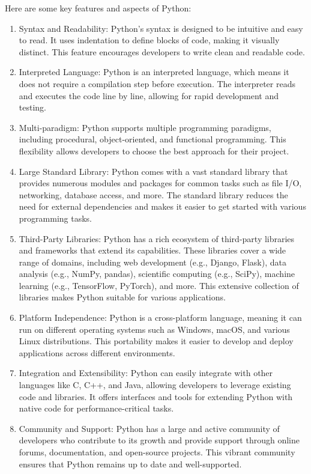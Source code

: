 \documentclass[12 pt, oneside]{book}
\begin{document}
Here are some key features and aspects of Python:
\begin{enumerate}
\item  Syntax and Readability: Python's syntax is designed to be intuitive and easy to read. It uses indentation to define blocks of code, making it visually distinct. This feature encourages developers to write clean and readable code.

\item  Interpreted Language: Python is an interpreted language, which means it does not require a compilation step before execution. The interpreter reads and executes the code line by line, allowing for rapid development and testing.

\item  Multi-paradigm: Python supports multiple programming paradigms, including procedural, object-oriented, and functional programming. This flexibility allows developers to choose the best approach for their project.

\item  Large Standard Library: Python comes with a vast standard library that provides numerous modules and packages for common tasks such as file I/O, networking, database access, and more. The standard library reduces the need for external dependencies and makes it easier to get started with various programming tasks.

\item  Third-Party Libraries: Python has a rich ecosystem of third-party libraries and frameworks that extend its capabilities. These libraries cover a wide range of domains, including web development (e.g., Django, Flask), data analysis (e.g., NumPy, pandas), scientific computing (e.g., SciPy), machine learning (e.g., TensorFlow, PyTorch), and more. This extensive collection of libraries makes Python suitable for various applications.

\item  Platform Independence: Python is a cross-platform language, meaning it can run on different operating systems such as Windows, macOS, and various Linux distributions. This portability makes it easier to develop and deploy applications across different environments.

\item  Integration and Extensibility: Python can easily integrate with other languages like C, C++, and Java, allowing developers to leverage existing code and libraries. It offers interfaces and tools for extending Python with native code for performance-critical tasks.

\item Community and Support: Python has a large and active community of developers who contribute to its growth and provide support through online forums, documentation, and open-source projects. This vibrant community ensures that Python remains up to date and well-supported.
\end{enumerate}
\end{document}
